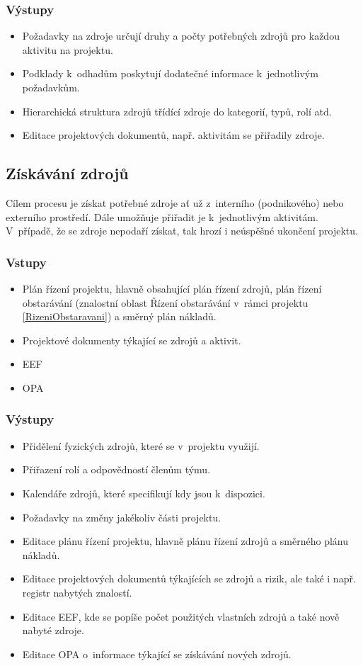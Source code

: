\subsubsection*{Výstupy}
\begin{itemize}
    \item Požadavky na zdroje určují druhy a počty potřebných zdrojů pro každou aktivitu na projektu.  
    \item Podklady k~odhadům poskytují dodatečné informace k~jednotlivým požadavkům.
    \item Hierarchická struktura zdrojů třídící zdroje do kategorií, typů, rolí atd.
    \item Editace projektových dokumentů, např. aktivitám se přiřadily zdroje.
\end{itemize}

\subsection*{Získávání zdrojů}

Cílem procesu je získat potřebné zdroje ať už z~interního (podnikového) nebo externího prostředí. Dále umožňuje přiřadit je k~jednotlivým aktivitám. V~případě, že se zdroje nepodaří získat, tak hrozí i neúspěšné ukončení projektu.

\subsubsection*{Vstupy}
\begin{itemize}
    \item Plán řízení projektu, hlavně obsahující plán řízení zdrojů, plán řízení obstarávání (znalostní oblast Řízení obstarávání v~rámci projektu \ref{RizeniObstaravani}) a směrný plán nákladů.
    \item Projektové dokumenty týkající se zdrojů a aktivit.
    \item EEF
    \item OPA
\end{itemize}
\subsubsection*{Výstupy}
\begin{itemize}
    \item Přidělení fyzických zdrojů, které se v~projektu využijí.  
    \item Přiřazení rolí a odpovědností členům týmu.
    \item Kalendáře zdrojů, které specifikují kdy jsou k~dispozici.
    \item Požadavky na změny jakékoliv části projektu.
    \item Editace plánu řízení projektu, hlavně plánu řízení zdrojů a směrného plánu nákladů.
    \item Editace projektových dokumentů týkajících se zdrojů a rizik, ale také i např. registr nabytých znalostí.
    \item Editace EEF, kde se popíše počet použitých vlastních zdrojů a také nově nabyté zdroje.
    \item Editace OPA o~informace týkající se získávání nových zdrojů.
\end{itemize}

